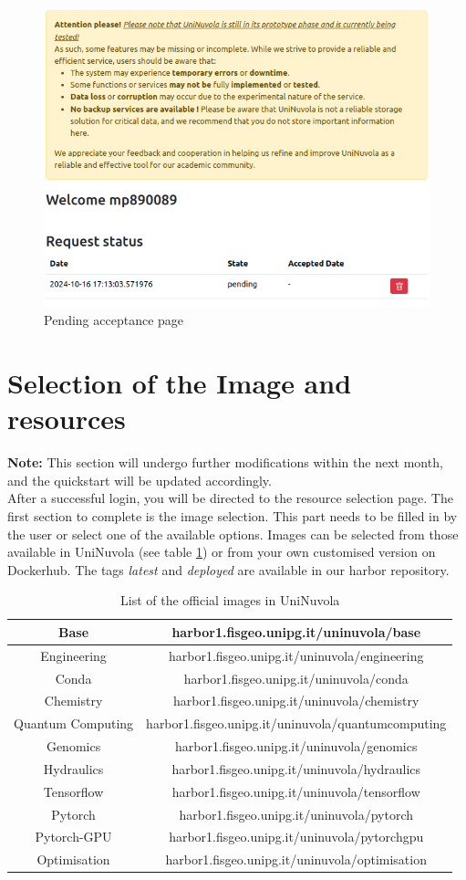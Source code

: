 \documentclass[a4paper,11pt]{article}
\begin{document}
\begin{figure}[!ht]
    \centering
    \includegraphics[width=0.5\linewidth]{request_page.png}
    \caption{Pending acceptance page}
    \label{fig:pending}
\end{figure}

\section{Selection of the Image and resources}

\textbf{Note:} This section will undergo further modifications within the next month, and the quickstart will be updated accordingly. \\

After a successful login, you will be directed to the resource selection page. The first section to complete is the image selection. This part needs to be filled in by the user or select one of the available options. Images can be selected from those available in UniNuvola (see table \ref{tab:images}) or from your own customised version on Dockerhub. The tags \textit{latest} and \textit{deployed} are available in our harbor repository.\\

\begin{table}[]
\caption{List of the official images in UniNuvola}
\label{tab:images}
\centering
\begin{tabular}{|c|c|}
\hline
Base & harbor1.fisgeo.unipg.it/uninuvola/base \\ \hline
Engineering & harbor1.fisgeo.unipg.it/uninuvola/engineering \\ \hline
Conda &harbor1.fisgeo.unipg.it/uninuvola/conda \\ \hline
Chemistry & harbor1.fisgeo.unipg.it/uninuvola/chemistry \\ \hline
Quantum Computing & harbor1.fisgeo.unipg.it/uninuvola/quantumcomputing \\ \hline
Genomics & harbor1.fisgeo.unipg.it/uninuvola/genomics \\ \hline
Hydraulics & harbor1.fisgeo.unipg.it/uninuvola/hydraulics \\ \hline
Tensorflow & harbor1.fisgeo.unipg.it/uninuvola/tensorflow  \\ \hline
Pytorch & harbor1.fisgeo.unipg.it/uninuvola/pytorch \\ \hline
Pytorch-GPU & harbor1.fisgeo.unipg.it/uninuvola/pytorchgpu \\ \hline
Optimisation & harbor1.fisgeo.unipg.it/uninuvola/optimisation \\ \hline
\end{tabular}
\end{table}
\end{document}
